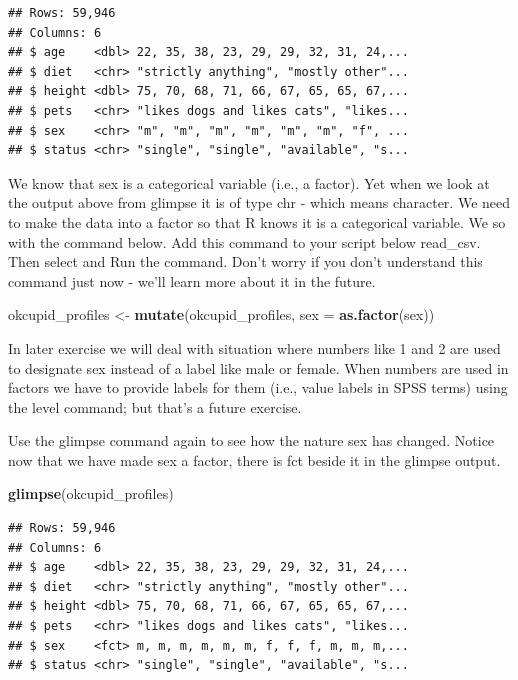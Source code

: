 \documentclass[
]{krantz}
\makeatletter
\newenvironment{Shaded}{\begin{snugshade}}{\end{snugshade}}
\newcommand{\DataTypeTok}[1]{\textcolor[rgb]{0.27,0.27,0.27}{#1}}
\newcommand{\KeywordTok}[1]{\textcolor[rgb]{0.27,0.27,0.27}{\textbf{#1}}}
\newcommand{\NormalTok}[1]{#1}
\newcommand{\StringTok}[1]{\textcolor[rgb]{0.5,0.5,0.5}{#1}}
\newenvironment{kframe}{%
\medskip{}
\setlength{\fboxsep}{.8em}
 \def\at@end@of@kframe{}%
 \ifinner\ifhmode%
  \def\at@end@of@kframe{\end{minipage}}%
  \begin{minipage}{\columnwidth}%
 \fi\fi%
 \def\FrameCommand##1{\hskip\@totalleftmargin \hskip-\fboxsep
 \colorbox{shadecolor}{##1}\hskip-\fboxsep
     \hskip-\linewidth \hskip-\@totalleftmargin \hskip\columnwidth}%
 \MakeFramed {\advance\hsize-\width
   \@totalleftmargin\z@ \linewidth\hsize
   \@setminipage}}%
 {\par\unskip\endMakeFramed%
 \at@end@of@kframe}
\renewenvironment{Shaded}{\begin{kframe}}{\end{kframe}}
\makeatother
\begin{document}
\begin{verbatim}
## Rows: 59,946
## Columns: 6
## $ age    <dbl> 22, 35, 38, 23, 29, 29, 32, 31, 24,...
## $ diet   <chr> "strictly anything", "mostly other"...
## $ height <dbl> 75, 70, 68, 71, 66, 67, 65, 65, 67,...
## $ pets   <chr> "likes dogs and likes cats", "likes...
## $ sex    <chr> "m", "m", "m", "m", "m", "m", "f", ...
## $ status <chr> "single", "single", "available", "s...
\end{verbatim}

We know that sex is a categorical variable (i.e., a factor). Yet when we look at the output above from glimpse it is of type chr - which means character. We need to make the data into a factor so that R knows it is a categorical variable. We so with the command below. Add this command to your script below read\_csv. Then select and Run the command. Don't worry if you don't understand this command just now - we'll learn more about it in the future.

\begin{Shaded}
\begin{Highlighting}[]
\NormalTok{okcupid_profiles <-}\StringTok{ }\KeywordTok{mutate}\NormalTok{(okcupid_profiles, }\DataTypeTok{sex =} \KeywordTok{as.factor}\NormalTok{(sex))}
\end{Highlighting}
\end{Shaded}

In later exercise we will deal with situation where numbers like 1 and 2 are used to designate sex instead of a label like male or female. When numbers are used in factors we have to provide labels for them (i.e., value labels in SPSS terms) using the level command; but that's a future exercise.

Use the glimpse command again to see how the nature sex has changed. Notice now that we have made sex a factor, there is fct beside it in the glimpse output.

\begin{Shaded}
\begin{Highlighting}[]
\KeywordTok{glimpse}\NormalTok{(okcupid_profiles)}
\end{Highlighting}
\end{Shaded}

\begin{verbatim}
## Rows: 59,946
## Columns: 6
## $ age    <dbl> 22, 35, 38, 23, 29, 29, 32, 31, 24,...
## $ diet   <chr> "strictly anything", "mostly other"...
## $ height <dbl> 75, 70, 68, 71, 66, 67, 65, 65, 67,...
## $ pets   <chr> "likes dogs and likes cats", "likes...
## $ sex    <fct> m, m, m, m, m, m, f, f, f, m, m, m,...
## $ status <chr> "single", "single", "available", "s...
\end{verbatim}
\end{document}
